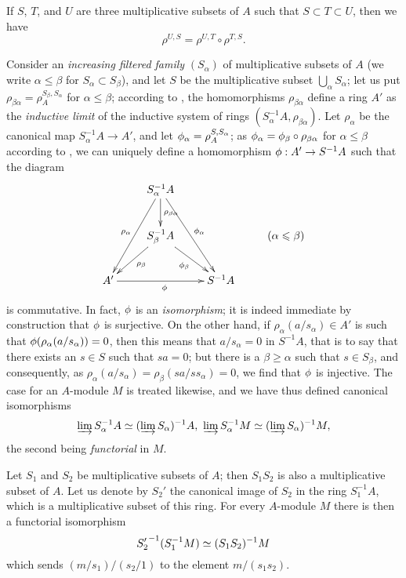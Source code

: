 \begin{env}[1.4.4]
\label{0.1.4.4}
If $S$, $T$, and $U$ are three multiplicative subsets of $A$ such that $S\subset T\subset U$, then we have
\[
  \rho^{U,S}=\rho^{U,T}\circ\rho^{T,S}.
\]
\end{env}

\begin{env}[1.4.5]
\label{0.1.4.5}
Consider an \emph{increasing filtered family} $(S_\alpha)$ of multiplicative
subsets of $A$ (we write $\alpha\leq\beta$ for $S_\alpha\subset S_\beta$),
and let $S$ be the multiplicative subset $\bigcup_\alpha S_\alpha$; let us put
$\rho_{\beta\alpha}=\rho_A^{S_\beta,S_\alpha}$ for $\alpha\leq\beta$;
according to , the homomorphisms $\rho_{\beta\alpha}$ define a
ring $A'$ as the \emph{inductive limit} of the inductive system of rings
$(S_\alpha^{-1}A,\rho_{\beta\alpha})$.
Let $\rho_\alpha$ be the canonical map $S_\alpha^{-1}A\to A'$, and let $\phi_\alpha=\rho_A^{S,S_\alpha}$; as
$\phi_\alpha=\phi_\beta\circ\rho_{\beta\alpha}$ for $\alpha\leq\beta$
according to , we can uniquely define a homomorphism $\vphi:A'\to S^{-1}A$ such that the diagram
\[
  \xymatrix{
    & S_\alpha^{-1}A\ar[ddl]_{\rho_\alpha}\ar[d]^{\rho_{\beta\alpha}}\ar[rdd]^{\vphi_\alpha}\\
    & S_\beta^{-1}A\ar[ld]^{\rho_\beta}\ar[rd]_{\vphi_\beta}
    & & (\alpha\leq\beta)\\
    A'\ar[rr]_\vphi & &
    S^{-1}A
  }
\]
is commutative.
In fact, $\phi$ is an \emph{isomorphism}; it is indeed immediate by construction that $\phi$ is surjective.
On the other hand, if $\rho_\alpha(a/s_\alpha)\in A'$ is such that $\phi(\rho_\alpha(a/s_\alpha))=0$, then this means that $a/s_\alpha=0$ in $S^{-1}A$, that is to say that there exists an $s\in S$ such that $sa=0$; but there is a $\beta\geq\alpha$ such that $s\in S_\beta$, and consequently, as $\rho_\alpha(a/s_\alpha)=\rho_\beta(sa/ss_\alpha)=0$, we find that $\phi$ is injective.
The case for an $A$-module $M$ is treated likewise, and we have thus defined canonical isomorphisms
\[
  \varinjlim S_\alpha^{-1}A\simeq(\varinjlim S_\alpha)^{-1}A,\
  \varinjlim S_\alpha^{-1}M\simeq(\varinjlim S_\alpha)^{-1}M,
\]
the second being \emph{functorial} in $M$.
\end{env}

\begin{env}[1.4.6]
\label{0.1.4.6}
Let $S_1$ and $S_2$ be multiplicative subsets of $A$; then $S_1 S_2$ is also a
multiplicative subset of $A$. Let us denote by $S_2'$ the canonical image of
$S_2$ in the ring $S_1^{-1}A$, which is a multiplicative subset of this ring.
For every $A$-module $M$ there is then a functorial isomorphism
\[
  {S_2'}^{-1}(S_1^{-1}M)\simeq(S_1 S_2)^{-1}M
\]
which sends $(m/s_1)/(s_2/1)$ to the element $m/(s_1 s_2)$.
\end{env}

